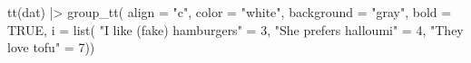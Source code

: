 \documentclass[
  letterpaper,
  DIV=11,
  numbers=noendperiod]{scrartcl}
\newenvironment{Shaded}{\begin{snugshade}}{\end{snugshade}}
\newcommand{\AttributeTok}[1]{\textcolor[rgb]{0.40,0.45,0.13}{#1}}
\newcommand{\ConstantTok}[1]{\textcolor[rgb]{0.56,0.35,0.01}{#1}}
\newcommand{\DecValTok}[1]{\textcolor[rgb]{0.68,0.00,0.00}{#1}}
\newcommand{\FunctionTok}[1]{\textcolor[rgb]{0.28,0.35,0.67}{#1}}
\newcommand{\NormalTok}[1]{\textcolor[rgb]{0.00,0.23,0.31}{#1}}
\newcommand{\OtherTok}[1]{\textcolor[rgb]{0.00,0.23,0.31}{#1}}
\newcommand{\SpecialCharTok}[1]{\textcolor[rgb]{0.37,0.37,0.37}{#1}}
\newcommand{\StringTok}[1]{\textcolor[rgb]{0.13,0.47,0.30}{#1}}
\begin{document}
\begin{Shaded}
\begin{Highlighting}[]
\FunctionTok{tt}\NormalTok{(dat) }\SpecialCharTok{|\textgreater{}} 
  \FunctionTok{group\_tt}\NormalTok{(}
    \AttributeTok{align =} \StringTok{"c"}\NormalTok{,}
    \AttributeTok{color =} \StringTok{"white"}\NormalTok{,}
    \AttributeTok{background =} \StringTok{"gray"}\NormalTok{,}
    \AttributeTok{bold =} \ConstantTok{TRUE}\NormalTok{,}
    \AttributeTok{i =} \FunctionTok{list}\NormalTok{(}
      \StringTok{"I like (fake) hamburgers"} \OtherTok{=} \DecValTok{3}\NormalTok{,}
      \StringTok{"She prefers halloumi"} \OtherTok{=} \DecValTok{4}\NormalTok{,}
      \StringTok{"They love tofu"} \OtherTok{=} \DecValTok{7}\NormalTok{))}
\end{Highlighting}
\end{Shaded}
\end{document}
